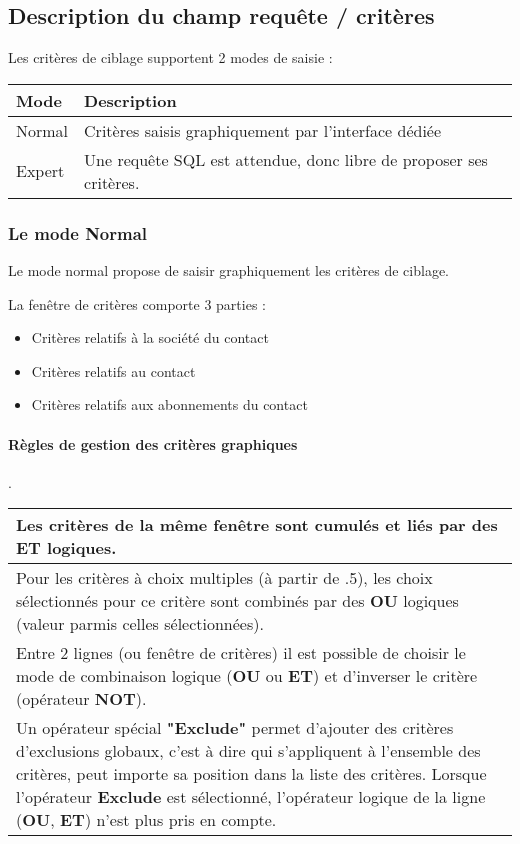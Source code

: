 \subsection{Description du champ requête / critères}
\label{u_list_req}

Les critères de ciblage supportent 2 modes de saisie :\\

\begin{tabular}{|p{3cm}|p{10cm}|}
\hline
\textbf{Mode} & \textbf{Description} \\
\hline
Normal & Critères saisis graphiquement par l'interface dédiée \\
\hline
Expert & Une requête SQL est attendue, donc libre de proposer ses critères.\\
\hline
\end{tabular}


\subsubsection{Le mode Normal}
Le mode normal propose de saisir graphiquement les critères de ciblage.

La fenêtre de critères comporte 3 parties : \\

\begin{itemize}
\item Critères relatifs à la société du contact
\item Critères relatifs au contact
\item Critères relatifs aux abonnements du contact
\end{itemize}
\vspace{0.3cm}

\paragraph{Règles de gestion des critères graphiques}.\\

\begin{tabular}{|p{14cm}|}
\hline
Les critères de la même fenêtre sont cumulés et liés par des \textbf{ET} logiques.\\
\hline
Pour les critères à choix multiples (à partir de \obm 1.2.5), les choix sélectionnés pour ce critère sont combinés par des \textbf{OU} logiques (valeur parmis celles sélectionnées).\\
\hline
Entre 2 lignes (ou fenêtre de critères) il est possible de choisir le mode de combinaison logique (\textbf{OU} ou \textbf{ET}) et d'inverser le critère (opérateur \textbf{NOT}).\\
\hline
Un opérateur spécial \textbf{"Exclude"} permet d'ajouter des critères d'exclusions globaux, c'est à dire qui s'appliquent à l'ensemble des critères, peut importe sa position dans la liste des critères.
Lorsque l'opérateur \textbf{Exclude} est sélectionné, l'opérateur logique de la ligne (\textbf{OU}, \textbf{ET}) n'est plus pris en compte.
\\
\hline
\end{tabular}


